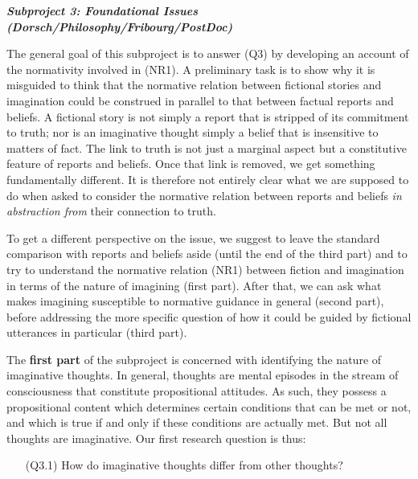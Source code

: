 \vspace{.4cm}
\noindent\textbf{\emph{Subproject 3: Foundational Issues (Dorsch/Philosophy/Fribourg/PostDoc)}}
\vspace{.1cm}

\noindent The general goal of this subproject is to answer (Q3) by developing an account of the normativity involved in (NR1). A preliminary task is to show why it is misguided to think that the normative relation between fictional stories and imagination could be construed in parallel to that between factual reports and beliefs. A fictional story is not simply a report that is stripped of its commitment to truth; nor is an imaginative thought simply a belief that is insensitive to matters of fact. The link to truth is not just a marginal aspect but a constitutive feature of reports and beliefs. Once that link is removed, we get something fundamentally different. It is therefore not entirely clear what we are supposed to do when asked to consider the normative relation between reports and beliefs \emph{in abstraction from} their connection to truth.

To get a different perspective on the issue, we suggest to leave the standard comparison with reports and beliefs aside (until the end of the third part) and to try to understand the normative relation (NR1) between fiction and imagination in terms of the nature of imagining (first part). After that, we can ask what makes imagining susceptible to normative guidance in general (second part), before addressing the more specific question of how it could be guided by fictional utterances in particular (third part).

The \textbf{first part} of the subproject is concerned with identifying the nature of imaginative thoughts. In general, thoughts are mental episodes in the stream of consciousness that constitute propositional attitudes. As such, they possess a propositional content which determines certain conditions that can be met or not, and which is true if and only if these conditions are actually met. But not all thoughts are imaginative. Our first research question is thus:

\vspace{-.1cm}
\begin{itemize}[leftmargin=2cm]
\item[(Q3.1)] How do imaginative thoughts differ from other thoughts?
\end{itemize}
\vspace{-.1cm}


